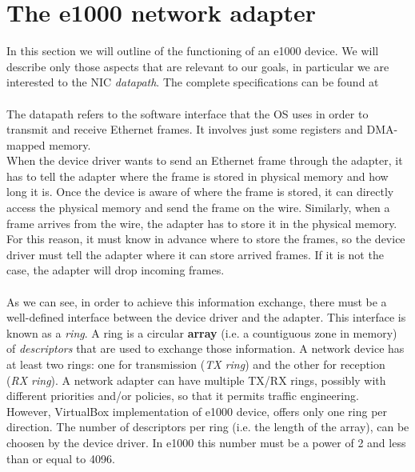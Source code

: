 \documentclass[a4paper, 12pt, titlepage]{report}
\begin{document}
\section{The e1000 network adapter} \label{sec:e1000_adapter}
In this section we will outline of the functioning of an e1000 device. We will describe only those aspects that are relevant to our goals, in particular we are interested to the NIC \textit{datapath}. The complete specifications can be found at~\cite{e1000}
\\
\\
The datapath refers to the software interface that the OS uses in order to transmit and receive Ethernet frames. It involves just some registers and DMA-mapped memory.
\\
When the device driver wants to send an Ethernet frame through the adapter, it has to tell the adapter where the frame is stored in physical memory and how long it is. Once the device is aware of where the frame is stored, it can directly access the physical memory and send the frame on the wire. Similarly, when a frame arrives from the wire, the adapter has to store it in the physical memory. For this reason, it must know in advance where to store the frames, so the device driver must tell the adapter where it can store arrived frames. If it is not the case, the adapter will drop incoming frames.
\\
\\
As we can see, in order to achieve this information exchange, there must be a well-defined interface between the device driver and the adapter. This interface is known as a \textit{ring}. A ring is a circular \textbf{array} (i.e. a countiguous zone in memory) of \textit{descriptors} that are used to exchange  those information. A network device has at least two rings: one for transmission (\textit{TX ring}) and the other for reception (\textit{RX ring}). A network adapter can have multiple TX/RX rings, possibly with different priorities and/or policies, so that it permits traffic engineering.
\\
However, VirtualBox implementation of e1000 device, offers only one ring per direction. The number of descriptors per ring (i.e. the length of the array), can be choosen by the device driver. In e1000 this number must be a power of 2 and less than or equal to 4096.
\end{document}
